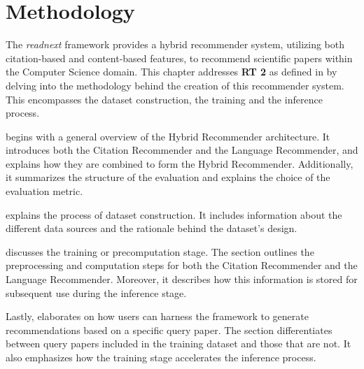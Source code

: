 \chapter{Methodology} \label{sec:methodology}

The \emph{readnext} framework provides a hybrid recommender system, utilizing both citation-based and content-based features, to recommend scientific papers within the Computer Science domain. This chapter addresses \textbf{\ac{RT} 2} as defined in  by delving into the methodology behind the creation of this recommender system. This encompasses the dataset construction, the training and the inference process.

 begins with a general overview of the Hybrid Recommender architecture. It introduces both the Citation Recommender and the Language Recommender, and explains how they are combined to form the Hybrid Recommender.
Additionally, it summarizes the structure of the evaluation and explains the choice of the evaluation metric.

 explains the process of dataset construction. It includes information about the different data sources and the rationale behind the dataset's design.

 discusses the training or precomputation stage. The section outlines the preprocessing and computation steps for both the Citation Recommender and the Language Recommender. Moreover, it describes how this information is stored for subsequent use during the inference stage.

Lastly,  elaborates on how users can harness the framework to generate recommendations based on a specific query paper. The section differentiates between query papers included in the training dataset and those that are not. It also emphasizes how the training stage accelerates the inference process.
